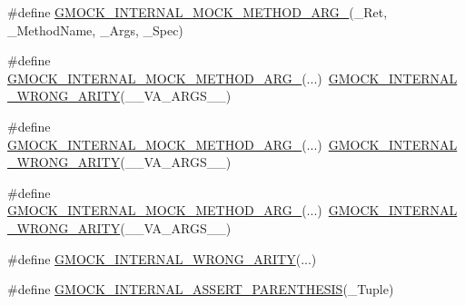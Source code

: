 \begin{DoxyCompactItemize}
\item 
\#define \mbox{\hyperlink{googletest-master_2googlemock_2include_2gmock_2gmock-function-mocker_8h_ad8a2523f8167f8c85b082c8c65f31b87}{G\+M\+O\+C\+K\+\_\+\+I\+N\+T\+E\+R\+N\+A\+L\+\_\+\+M\+O\+C\+K\+\_\+\+M\+E\+T\+H\+O\+D\+\_\+\+A\+R\+G\+\_}}(\+\_\+\+Ret,  \+\_\+\+Method\+Name,  \+\_\+\+Args,  \+\_\+\+Spec)
\item 
\#define \mbox{\hyperlink{googletest-master_2googlemock_2include_2gmock_2gmock-function-mocker_8h_a761ee1701ece858571b5d950cb6de86a}{G\+M\+O\+C\+K\+\_\+\+I\+N\+T\+E\+R\+N\+A\+L\+\_\+\+M\+O\+C\+K\+\_\+\+M\+E\+T\+H\+O\+D\+\_\+\+A\+R\+G\+\_}}(...)~\mbox{\hyperlink{_obj__test_2lib_2googletest-master_2googlemock_2include_2gmock_2gmock-function-mocker_8h_a592456f4bfcfc9a9a3a6b1482ed569f4}{G\+M\+O\+C\+K\+\_\+\+I\+N\+T\+E\+R\+N\+A\+L\+\_\+\+W\+R\+O\+N\+G\+\_\+\+A\+R\+I\+TY}}(\+\_\+\+\_\+\+V\+A\+\_\+\+A\+R\+G\+S\+\_\+\+\_\+)
\item 
\#define \mbox{\hyperlink{googletest-master_2googlemock_2include_2gmock_2gmock-function-mocker_8h_a63f6315200efc8b74271ae1a41d22efd}{G\+M\+O\+C\+K\+\_\+\+I\+N\+T\+E\+R\+N\+A\+L\+\_\+\+M\+O\+C\+K\+\_\+\+M\+E\+T\+H\+O\+D\+\_\+\+A\+R\+G\+\_}}(...)~\mbox{\hyperlink{_obj__test_2lib_2googletest-master_2googlemock_2include_2gmock_2gmock-function-mocker_8h_a592456f4bfcfc9a9a3a6b1482ed569f4}{G\+M\+O\+C\+K\+\_\+\+I\+N\+T\+E\+R\+N\+A\+L\+\_\+\+W\+R\+O\+N\+G\+\_\+\+A\+R\+I\+TY}}(\+\_\+\+\_\+\+V\+A\+\_\+\+A\+R\+G\+S\+\_\+\+\_\+)
\item 
\#define \mbox{\hyperlink{googletest-master_2googlemock_2include_2gmock_2gmock-function-mocker_8h_a6d021b39d45073a431b4bc97f8173d70}{G\+M\+O\+C\+K\+\_\+\+I\+N\+T\+E\+R\+N\+A\+L\+\_\+\+M\+O\+C\+K\+\_\+\+M\+E\+T\+H\+O\+D\+\_\+\+A\+R\+G\+\_}}(...)~\mbox{\hyperlink{_obj__test_2lib_2googletest-master_2googlemock_2include_2gmock_2gmock-function-mocker_8h_a592456f4bfcfc9a9a3a6b1482ed569f4}{G\+M\+O\+C\+K\+\_\+\+I\+N\+T\+E\+R\+N\+A\+L\+\_\+\+W\+R\+O\+N\+G\+\_\+\+A\+R\+I\+TY}}(\+\_\+\+\_\+\+V\+A\+\_\+\+A\+R\+G\+S\+\_\+\+\_\+)
\item 
\#define \mbox{\hyperlink{googletest-master_2googlemock_2include_2gmock_2gmock-function-mocker_8h_a592456f4bfcfc9a9a3a6b1482ed569f4}{G\+M\+O\+C\+K\+\_\+\+I\+N\+T\+E\+R\+N\+A\+L\+\_\+\+W\+R\+O\+N\+G\+\_\+\+A\+R\+I\+TY}}(...)
\item 
\#define \mbox{\hyperlink{googletest-master_2googlemock_2include_2gmock_2gmock-function-mocker_8h_a0cd5db518de5d6abfbafe24d19a35362}{G\+M\+O\+C\+K\+\_\+\+I\+N\+T\+E\+R\+N\+A\+L\+\_\+\+A\+S\+S\+E\+R\+T\+\_\+\+P\+A\+R\+E\+N\+T\+H\+E\+S\+IS}}(\+\_\+\+Tuple)

\end{DoxyCompactItemize}
